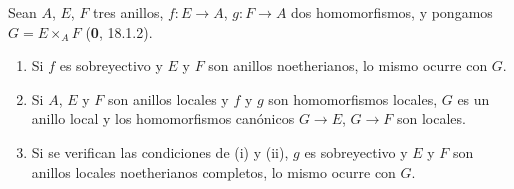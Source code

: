 \begin{lemma}[19.3.2.1]
\label{IV.19.3.2.1}
Sean $A$, $E$, $F$ tres anillos, $f:E\to A$, $g:F\to A$ dos homomorfismos, y pongamos $G=E\times_A F$ \textup{(\textbf{0}, 18.1.2)}.
\begin{enumerate}
  \item[\textup{(i)}] Si $f$ es sobreyectivo y $E$ y $F$ son anillos noetherianos, lo mismo ocurre con $G$.
  \item[\textup{(ii)}] Si $A$, $E$ y $F$ son anillos locales y $f$ y $g$ son homomorfismos locales, $G$ es un anillo local y los homomorfismos canónicos $G\to E$, $G\to F$ son locales.
  \item[\textup{(iii)}] Si se verifican las condiciones de \textup{(i)} y \textup{(ii)}, $g$ es sobreyectivo y $E$ y $F$ son anillos locales noetherianos completos, lo mismo ocurre con $G$.
\end{enumerate}
\end{lemma}


